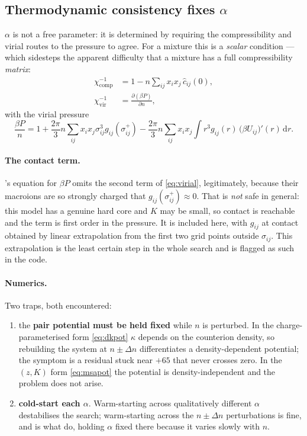 \documentclass[11pt,a4paper]{article}
\begin{document}
\subsection{Thermodynamic consistency fixes \texorpdfstring{$\alpha$}{alpha}}
\label{sec:alpha}

$\alpha$ is not a free parameter: it is determined by requiring the
compressibility and virial routes to the pressure to agree. For a mixture this
is a \emph{scalar} condition --- which sidesteps the apparent difficulty that
a mixture has a full compressibility \emph{matrix}:
\begin{align}
\chi^{-1}_{\text{comp}} &= 1 - n\sum_{ij}x_ix_j\,\hat c_{ij}(0),
\label{eq:chicomp}\\
\chi^{-1}_{\text{vir}} &= \frac{\partial(\beta P)}{\partial n},
\label{eq:chivir}
\end{align}
with the virial pressure
\begin{equation}
\frac{\beta P}{n} = 1
  + \frac{2\pi}{3}n\sum_{ij}x_ix_j\sigma_{ij}^3 g_{ij}(\sigma_{ij}^+)
  - \frac{2\pi}{3}n\sum_{ij}x_ix_j\int r^3 g_{ij}(r)\,
    \bigl(\beta U_{ij}\bigr)'(r)\,\mathrm{d}r .
\label{eq:virial}
\end{equation}

\paragraph{The contact term.} \cite{DAguannoKlein1991}'s equation for $\beta P$
omits the second term of \eqref{eq:virial}, legitimately, because their
macroions are so strongly charged that $g_{ij}(\sigma_{ij}^+)\approx0$. That
is \emph{not} safe in general: this model has a genuine hard core and $K$ may
be small, so contact is reachable and the term is first order in the
pressure. It is included here, with $g_{ij}$ at contact obtained by linear
extrapolation from the first two grid points outside $\sigma_{ij}$. This
extrapolation is the least certain step in the whole search and is flagged as
such in the code.

\paragraph{Numerics.} Two traps, both encountered:
\begin{enumerate}[nosep]
\item the \textbf{pair potential must be held fixed} while $n$ is perturbed.
      In the charge-parameterised form \eqref{eq:dkpot} $\kappa$ depends on
      the counterion density, so rebuilding the system at $n\pm\Delta n$
      differentiates a density-dependent potential; the symptom is a residual
      stuck near $+65$ that never crosses zero. In the $(z,K)$ form
      \eqref{eq:msapot} the potential is density-independent and the problem
      does not arise.
\item \textbf{cold-start each $\alpha$}. Warm-starting across qualitatively
      different $\alpha$ destabilises the search; warm-starting across the
      $n\pm\Delta n$ perturbations is fine, and is what \cite{DAguannoKlein1991}
      do, holding $\alpha$ fixed there because it varies slowly with $n$.
\end{enumerate}
\end{document}
